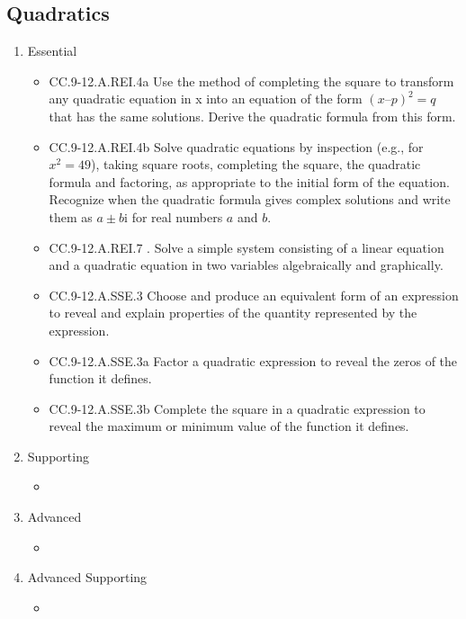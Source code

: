 \documentclass{article}
\begin{document}
\subsection*{Quadratics}
\begin{enumerate}
	\item Essential
	\begin{itemize}
		\item CC.9-12.A.REI.4a Use the method of completing the square to transform any quadratic equation in x into an equation of the form $(x – p)^2 = q$ that has the same solutions. Derive the quadratic formula from this form. 
		\item CC.9-12.A.REI.4b Solve quadratic equations by inspection (e.g., for $x^2 = 49$), taking square roots, completing the square, the quadratic formula and factoring, as appropriate to the initial form of the equation. Recognize when the quadratic formula gives complex solutions and write them as $a \pm b\textrm{i}$ for real numbers $a$ and $b$.
		\item CC.9-12.A.REI.7 . Solve a simple system consisting of a linear equation and a quadratic equation in two variables algebraically and graphically. 
		\item CC.9-12.A.SSE.3 Choose and produce an equivalent form of an expression to reveal and explain properties of the quantity represented by the expression.
		\item CC.9-12.A.SSE.3a Factor a quadratic expression to reveal the zeros of the function it defines.
		\item CC.9-12.A.SSE.3b Complete the square in a quadratic expression to reveal the maximum or minimum value of the function it defines.
	\end{itemize}		
	\item Supporting
	\begin{itemize}
		\item
	\end{itemize}
	\item Advanced
	\begin{itemize}
		\item
	\end{itemize}
	\item Advanced Supporting
	\begin{itemize}
		\item
	\end{itemize}
\end{enumerate}
\end{document}

